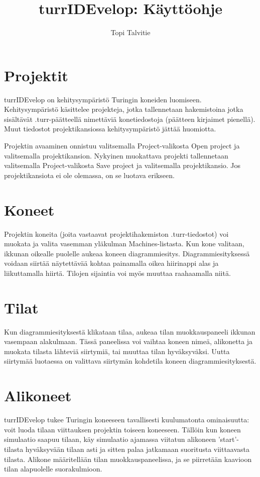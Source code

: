 \documentclass[a4paper, 11pt, finnish]{article}
\author{Topi Talvitie}
\title{turrIDEvelop: Käyttöohje}
\begin{document}
\maketitle

\section{Projektit}
turrIDEvelop on kehitysympäristö Turingin koneiden luomiseen. Kehitysympäristö
käsittelee projekteja, jotka tallennetaan hakemistoina jotka sisältävät
.turr-päätteellä nimettäviä konetiedostoja (päätteen kirjaimet pienellä).
Muut tiedostot projektikansiossa kehitysympäristö jättää huomiotta.

Projektin avaaminen onnistuu valitsemalla Project-valikosta Open project ja
valitsemalla projektikansion. Nykyinen muokattava projekti tallennetaan
valitsemalla Project-valikosta Save project ja valitsemalla projektikansio.
Jos projektikansiota ei ole olemassa, on se luotava erikseen.

\section{Koneet}
Projektin koneita (joita vastaavat projektihakemiston .turr-tiedostot) voi
muokata ja valita vasemman yläkulman Machines-listasta. Kun kone valitaan,
ikkunan oikealle puolelle aukeaa koneen diagrammiesitys.
Diagrammiesityksessä voidaan siirtää näytettävää kohtaa painamalla oikea
hiirinappi alas ja liikuttamalla hiirtä. Tilojen sijaintia voi myös muuttaa
raahaamalla niitä.

\section{Tilat}
Kun diagrammiesityksestä klikataan tilaa, aukeaa tilan muokkauspaneeli ikkunan
vasempaan alakulmaan. Tässä paneelissa voi vaihtaa koneen nimeä, alikonetta ja
muokata tilasta lähteviä siirtymiä, tai muuttaa tilan hyväksyväksi. Uutta
siirtymää luotaessa on valittava siirtymän kohdetila koneen diagrammiesityksestä.

\section{Alikoneet}
turrIDEvelop tukee Turingin koneeseen tavallisesti kuulumatonta ominaisuutta:
voit luoda tilaan viittauksen projektin toiseen koneeseen. Tällöin kun koneen
simulaatio saapuu tilaan, käy simulaatio ajamassa viitatun alikoneen
'start'-tilasta hyväksyvään tilaan asti ja sitten palaa jatkamaan suoritusta
viittaavasta tilasta. Alikone määritellään tilan muokkauspaneelissa, ja se
piirretään kaavioon tilan alapuolelle suorakulmioon.
\end{document}
